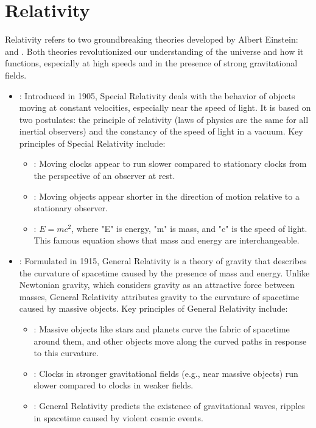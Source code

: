 \chapter{Relativity}
\thispagestyle{fancy}

Relativity refers to two groundbreaking theories developed by Albert Einstein:  and . Both theories revolutionized our understanding of the universe and how it functions, especially at high speeds and in the presence of strong gravitational fields.

\begin{itemize}
	\item {}: Introduced in 1905, Special Relativity deals with the behavior of objects moving at constant velocities, especially near the speed of light. It is based on two postulates: the principle of relativity (laws of physics are the same for all inertial observers) and the constancy of the speed of light in a vacuum. Key principles of Special Relativity include:
	\begin{itemize}
		\item {}: Moving clocks appear to run slower compared to stationary clocks from the perspective of an observer at rest.
		\item {}: Moving objects appear shorter in the direction of motion relative to a stationary observer.
		\item {}: $E=mc^2$, where "E" is energy, "m" is mass, and "c" is the speed of light. This famous equation shows that mass and energy are interchangeable.
	\end{itemize}

	\item {}: Formulated in 1915, General Relativity is a theory of gravity that describes the curvature of spacetime caused by the presence of mass and energy. Unlike Newtonian gravity, which considers gravity as an attractive force between masses, General Relativity attributes gravity to the curvature of spacetime caused by massive objects. Key principles of General Relativity include:
	\begin{itemize}
		\item {}: Massive objects like stars and planets curve the fabric of spacetime around them, and other objects move along the curved paths in response to this curvature.
		\item {}: Clocks in stronger gravitational fields (e.g., near massive objects) run slower compared to clocks in weaker fields.
		\item {}: General Relativity predicts the existence of gravitational waves, ripples in spacetime caused by violent cosmic events.
	\end{itemize}
\end{itemize}

